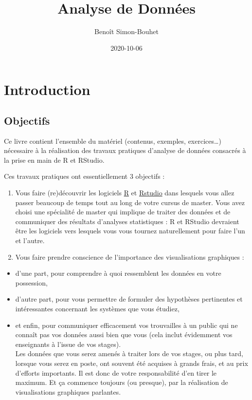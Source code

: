 \documentclass[
  a4paper,
]{article}
\title{Analyse de Données}
\author{Benoît Simon-Bouhet}
\date{2020-10-06}
\providecommand{\tightlist}{%
  \setlength{\itemsep}{0pt}\setlength{\parskip}{0pt}}
\begin{document}
\maketitle

{
\hypersetup{linkcolor=}
\setcounter{tocdepth}{2}
\tableofcontents
}
\hypertarget{introduction}{%
\section{Introduction}\label{introduction}}

\hypertarget{objectifs}{%
\subsection{Objectifs}\label{objectifs}}

Ce livre contient l'ensemble du matériel (contenus, exemples, exercices\ldots) nécessaire à la réalisation des travaux pratiques d'analyse de données consacrés à la prise en main de R et RStudio.

Ces travaux pratiques ont essentiellement 3 objectifs :

\begin{enumerate}
\def\labelenumi{\arabic{enumi}.}
\tightlist
\item
  Vous faire (re)découvrir les logiciels \href{https://cran.r-project.org}{R} et \href{https://www.rstudio.com}{Rstudio} dans lesquels vous allez passer beaucoup de temps tout au long de votre cursus de master. Vous avez choisi une spécialité de master qui implique de traiter des données et de communiquer des résultats d'analyses statistiques : R et RStudio devraient être les logiciels vers lesquels vous vous tournez naturellement pour faire l'un et l'autre.
\item
  Vous faire prendre conscience de l'importance des visualisations graphiques :
\end{enumerate}

\begin{itemize}
\tightlist
\item
  d'une part, pour comprendre à quoi ressemblent les données en votre possession,
\item
  d'autre part, pour vous permettre de formuler des hypothèses pertinentes et intéressantes concernant les systèmes que vous étudiez,
\item
  et enfin, pour communiquer efficacement vos trouvailles à un public qui ne connaît pas vos données aussi bien que vous (cela inclut évidemment vos enseignants à l'issue de vos stages).\\
  Les données que vous serez amenés à traiter lors de vos stages, ou plus tard, lorsque vous serez en poste, ont souvent été acquises à grands frais, et au prix d'efforts importants. Il est donc de votre responsabilité d'en tirer le maximum. Et ça commence toujours (ou presque), par la réalisation de visualisations graphiques parlantes.
\end{itemize}
\end{document}
